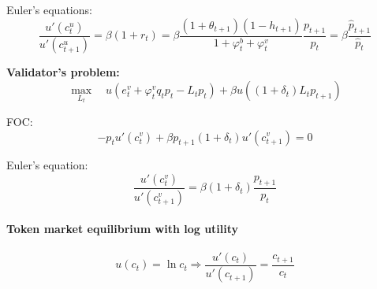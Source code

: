 \documentclass[./main.tex]{subfiles}
\begin{document}
Euler's equations:
\begin{equation}
    \frac{u'(c_t^u)}{u'(c_{t+1}^u)} = \beta (1+r_t) 
    = \beta \frac{(1+\theta_{t+1})(1-h_{t+1})}{1+\varphi_t^b+\varphi_t^v} \frac{p_{t+1}}{p_t}
    = \beta \frac{\hat{p}_{t+1}}{\hat{p}_t}
\end{equation}

\noindent \textbf{Validator's problem:}
\begin{equation}
    \max_{L_t}\quad u(e_t^v + \varphi_t^v q_t p_t - L_t p_t) + \beta u((1+\delta_t) L_t p_{t+1})
\end{equation}

FOC:
\begin{equation}
    -p_t u'(c_t^v) + \beta p_{t+1} (1+\delta_t) u'(c_{t+1}^v) = 0
\end{equation}

Euler's equation:
\begin{equation}
    \frac{u'(c_t^v)}{u'(c_{t+1}^v)} = \beta (1+\delta_t) \frac{p_{t+1}}{p_t}
\end{equation}

\paragraph{Token market equilibrium with log utility}

\begin{equation}
    u(c_t) = \ln c_t \Rightarrow \frac{u'(c_t)}{u'(c_{t+1})} = \frac{c_{t+1}}{c_t}
\end{equation}
\end{document}
